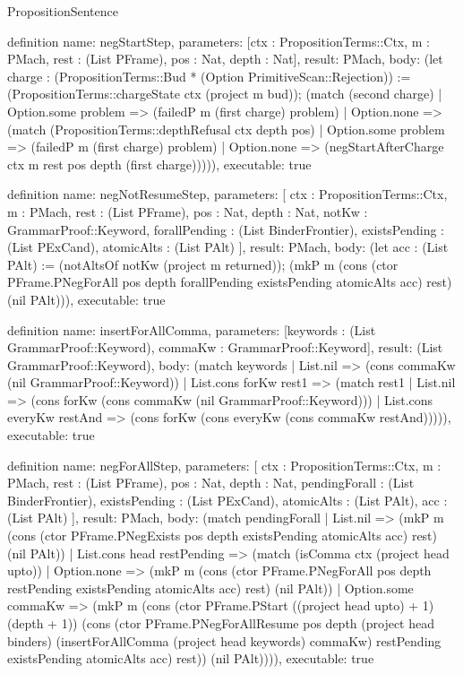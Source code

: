 \begin{lexlean}{PropositionSentence}
\begin{semanticmodule}
definition{
  name: negStartStep,
  parameters: [ctx : PropositionTerms::Ctx, m : PMach, rest : (List PFrame), pos : Nat, depth : Nat],
  result: PMach,
  body: (let charge : (PropositionTerms::Bud * (Option PrimitiveScan::Rejection)) := (PropositionTerms::chargeState ctx (project m bud)); (match (second charge)
    | Option.some problem => (failedP m (first charge) problem)
    | Option.none => (match (PropositionTerms::depthRefusal ctx depth pos)
        | Option.some problem => (failedP m (first charge) problem)
        | Option.none => (negStartAfterCharge ctx m rest pos depth (first charge))))),
  executable: true
}

definition{
  name: negNotResumeStep,
  parameters: [
    ctx : PropositionTerms::Ctx,
    m : PMach,
    rest : (List PFrame),
    pos : Nat,
    depth : Nat,
    notKw : GrammarProof::Keyword,
    forallPending : (List BinderFrontier),
    existsPending : (List PExCand),
    atomicAlts : (List PAlt)
  ],
  result: PMach,
  body: (let acc : (List PAlt) := (notAltsOf notKw (project m returned)); (mkP m (cons (ctor PFrame.PNegForAll pos depth forallPending existsPending atomicAlts acc) rest) (nil PAlt))),
  executable: true
}

definition{
  name: insertForAllComma,
  parameters: [keywords : (List GrammarProof::Keyword), commaKw : GrammarProof::Keyword],
  result: (List GrammarProof::Keyword),
  body: (match keywords
    | List.nil => (cons commaKw (nil GrammarProof::Keyword))
    | List.cons forKw rest1 => (match rest1
        | List.nil => (cons forKw (cons commaKw (nil GrammarProof::Keyword)))
        | List.cons everyKw restAnd => (cons forKw (cons everyKw (cons commaKw restAnd))))),
  executable: true
}

definition{
  name: negForAllStep,
  parameters: [
    ctx : PropositionTerms::Ctx,
    m : PMach,
    rest : (List PFrame),
    pos : Nat,
    depth : Nat,
    pendingForall : (List BinderFrontier),
    existsPending : (List PExCand),
    atomicAlts : (List PAlt),
    acc : (List PAlt)
  ],
  result: PMach,
  body: (match pendingForall
    | List.nil => (mkP m (cons (ctor PFrame.PNegExists pos depth existsPending atomicAlts acc) rest) (nil PAlt))
    | List.cons head restPending => (match (isComma ctx (project head upto))
        | Option.none => (mkP m (cons (ctor PFrame.PNegForAll pos depth restPending existsPending atomicAlts acc) rest) (nil PAlt))
        | Option.some commaKw => (mkP m (cons (ctor PFrame.PStart ((project head upto) + 1) (depth + 1)) (cons (ctor PFrame.PNegForAllResume pos depth (project head binders) (insertForAllComma (project head keywords) commaKw) restPending existsPending atomicAlts acc) rest)) (nil PAlt)))),
  executable: true
}


\end{semanticmodule}
\end{lexlean}

